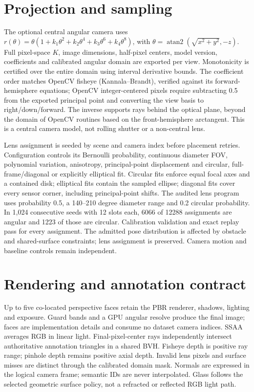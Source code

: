 \section{Projection and sampling}
The optional central angular camera uses $r(\theta)=\theta(1+k_1\theta^2+k_2\theta^4+k_3\theta^6+k_4\theta^8)$, with $\theta=\operatorname{atan2}(\sqrt{x^2+y^2},-z)$. Full pixel-space $K$, image dimensions, half-pixel centers, model version, coefficients and calibrated angular domain are exported per view. Monotonicity is certified over the entire domain using interval derivative bounds. The coefficient order matches OpenCV fisheye (Kannala--Brandt), verified against its forward-hemisphere equations; OpenCV integer-centered pixels require subtracting 0.5 from the exported principal point and converting the view basis to right/down/forward. The inverse supports rays behind the optical plane, beyond the domain of OpenCV routines based on the front-hemisphere arctangent. This is a central camera model, not rolling shutter or a non-central lens.

Lens assignment is seeded by scene and camera index before placement retries. Configuration controls its Bernoulli probability, continuous diameter FOV, polynomial variation, anisotropy, principal-point displacement and circular, full-frame/diagonal or explicitly elliptical fit. Circular fits enforce equal focal axes and a contained disk; elliptical fits contain the sampled ellipse; diagonal fits cover every sensor corner, including principal-point shifts. The audited lens program uses probability 0.5, a 140--210 degree diameter range and 0.2 circular probability. In 1,024 consecutive seeds with 12 slots each, 6066 of 12288 assignments are angular and 1223 of those are circular. Calibration validation and exact replay pass for every assignment. The admitted pose distribution is affected by obstacle and shared-surface constraints; lens assignment is preserved. Camera motion and baseline controls remain independent.

\section{Rendering and annotation contract}
Up to five co-located perspective faces retain the PBR renderer, shadows, lighting and exposure. Guard bands and a GPU angular resolve produce the final image; faces are implementation details and consume no dataset camera indices. SSAA averages RGB in linear light. Final-pixel-center rays independently intersect authoritative annotation triangles in a shared BVH. Fisheye depth is positive ray range; pinhole depth remains positive axial depth. Invalid lens pixels and surface misses are distinct through the calibrated domain mask. Normals are expressed in the logical camera frame; semantic IDs are never interpolated. Glass follows the selected geometric surface policy, not a refracted or reflected RGB light path.

